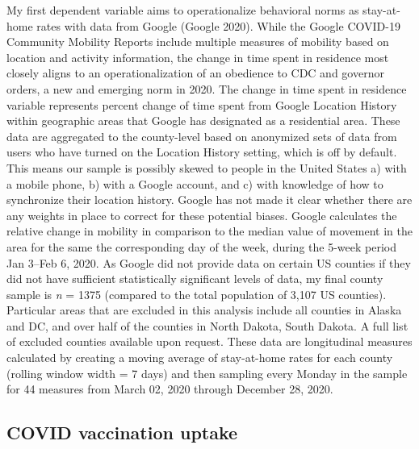 My first dependent variable aims to operationalize behavioral norms as
stay-at-home rates with data from Google (Google 2020). While the Google
COVID-19 Community Mobility Reports include multiple measures of mobility based
on location and activity information, the change in time spent in residence
most closely aligns to an operationalization of an obedience to CDC and governor
orders, a new and emerging norm in 2020. The change in time spent in residence
variable represents percent change of time spent from Google Location History
within geographic areas that Google has designated as a residential area. These
data are aggregated to the county-level based on anonymized sets of data from
users who have turned on the Location History setting, which is off by default.
This means our sample is possibly skewed to people in the United States a) with
a mobile phone, b) with a Google account, and c) with knowledge of how to
synchronize their location history. Google has not made it clear whether there
are any weights in place to correct for these potential biases. Google
calculates the relative change in mobility in comparison to the median value of
movement in the area for the same the corresponding day of the week, during the
5-week period Jan 3--Feb 6, 2020. As Google did not provide data on certain US
counties if they did not have sufficient statistically significant levels of
data, my final county sample is \emph{n} = 1375
(compared to the total population of 3,107 US counties). Particular areas that
are excluded in this analysis include all counties in Alaska and DC, and over
half of the counties in North Dakota, South Dakota. A full list of excluded
counties available upon request. These data are longitudinal measures calculated
by creating a moving average of stay-at-home rates for each county (rolling
window width = 7 days) and then sampling every
Monday in the sample for 44 measures from March 02, 2020 through December 28,
2020.

\hypertarget{covid-vaccination-uptake}{%
\subsection{COVID vaccination uptake}\label{covid-vaccination-uptake}}

